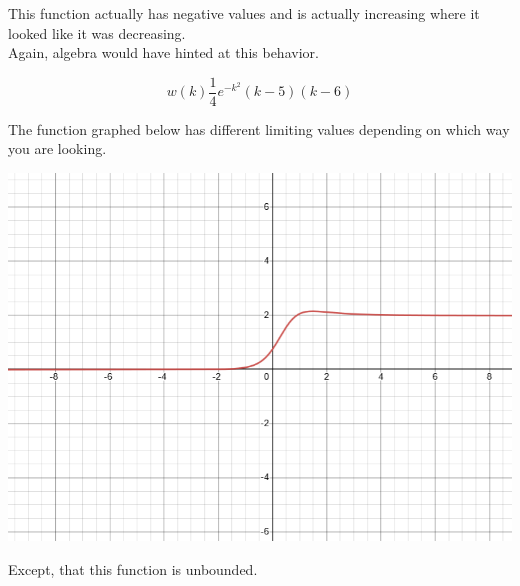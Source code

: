 \documentclass{ximera}
\begin{document}
\begin{example}
This function actually has negative values and is actually increasing where it looked like it was decreasing. \\


Again, algebra would have hinted at this behavior.

\[  w(k) \frac{1}{4} e^{-k^2} (k-5)(k-6)     \]


\end{example}










\begin{example}


The function graphed below has different limiting values depending on which way you are looking.

\begin{image}
\includegraphics{pics/graph_4A.png}
\end{image}




Except, that this function is unbounded.


\end{example}
\end{document}
